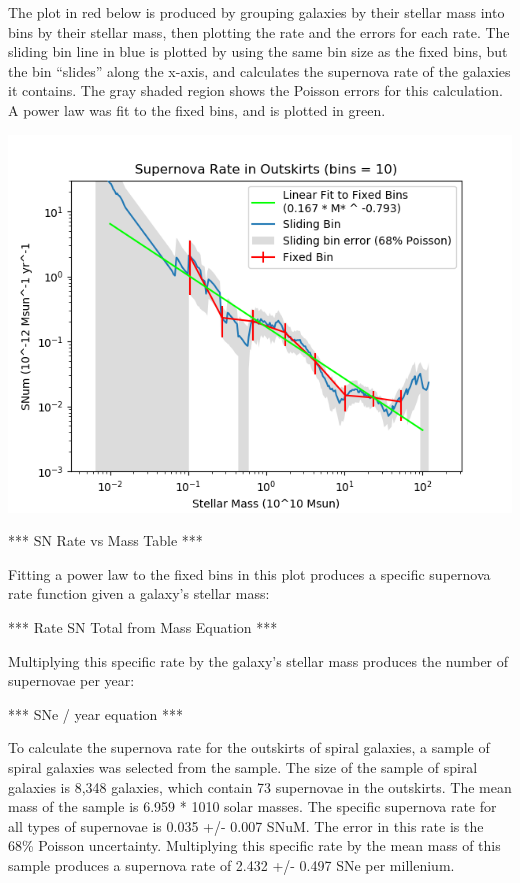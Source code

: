 \documentclass[apj]{emulateapj}
\begin{document}
The plot in red below is produced by grouping galaxies by their stellar mass into bins by their stellar mass, then plotting the rate and the errors for each rate. The sliding bin line in blue is plotted by using the same bin size as the fixed bins, but the bin “slides” along the x-axis, and calculates the supernova rate of the galaxies it contains. The gray shaded region shows the Poisson errors for this calculation. A power law was fit to the fixed bins, and is plotted in green.

\includegraphics[scale=0.5]{outskirts_sn_rate_vs_mass}

*** SN Rate vs Mass Table ***

Fitting a power law to the fixed bins in this plot produces a specific supernova rate function given a galaxy’s stellar mass:

*** Rate SN Total from Mass Equation ***

Multiplying this specific rate by the galaxy’s stellar mass produces the number of supernovae per year:

*** SNe / year equation ***

To calculate the supernova rate for the outskirts of spiral galaxies, a sample of spiral galaxies was selected from the sample. The size of the sample of spiral galaxies is 8,348 galaxies, which contain 73 supernovae in the outskirts. The mean mass of the sample is 6.959 * 1010 solar masses. The specific supernova rate for all types of supernovae is 0.035 +/- 0.007 SNuM. The error in this rate is the 68\% Poisson uncertainty. Multiplying this specific rate by the mean mass of this sample produces a supernova rate of 2.432 +/- 0.497 SNe per millenium.
\end{document}
